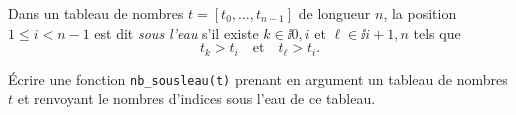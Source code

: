 \exer{}
\setcounter{numques}{0}

Dans un tableau de nombres $t = [t_0,\dots,t_{n-1}]$ de longueur $n$, la position $1 \leq i < n-1$ est dit \emph{sous l'eau} s'il existe $k \in \ii{0,i}$ et $\ell \in \ii{i+1,n}$ tels que 
\begin{equation*}
  t_k > t_i \quad\textrm{et}\quad t_\ell > t_i. 
\end{equation*}

\question{} Écrire une fonction \texttt{nb\_sousleau(t)} prenant en argument un tableau de nombres $t$ et renvoyant le nombres d'indices sous l'eau de ce tableau. 